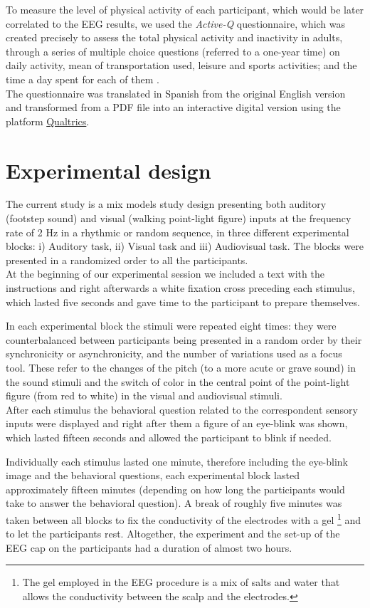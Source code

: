 To measure the level of physical activity of each participant, which would be later correlated to the EEG results, we used the \textit{Active-Q} questionnaire, which was created precisely to assess the total physical activity and inactivity in adults, through a series of multiple choice questions (referred to a one-year time) on daily activity, mean of transportation used, leisure and sports activities; and the time a day spent for each of them \parencite{Bonn_2012}. \\
The questionnaire was translated in Spanish from the original English version and transformed from a PDF file into an interactive digital version using the platform \href{https://www.qualtrics.com/uk/?rid=ip&prevsite=en&newsite=uk&geo=ES&geomatch=uk}{Qualtrics}. 

\section{Experimental design}
The current study is a mix models study design presenting both auditory (footstep sound) and visual (walking point-light figure) inputs at the frequency rate of 2 Hz in a rhythmic or random sequence, in three different experimental blocks: i) Auditory task, ii) Visual task and iii) Audiovisual task. The blocks were presented in a randomized order to all the participants. \\
At the beginning of our experimental session we included a text with the instructions and right afterwards a white fixation cross preceding each stimulus, which lasted five seconds and gave time to the participant to prepare themselves. 

In each experimental block the stimuli were repeated eight times: they were counterbalanced between participants being presented in a random order by their synchronicity or asynchronicity, and the number of variations used as a focus tool. These refer to the changes of the pitch (to a more acute or grave sound) in the sound stimuli and the switch of color  in the central point of the point-light figure (from red to white) in the visual and audiovisual stimuli. \\
After each stimulus the behavioral question related to the correspondent sensory inputs were displayed and right after them a figure of an eye-blink was shown, which lasted fifteen seconds and allowed the participant to blink if needed.

Individually each stimulus lasted one minute, therefore including the eye-blink image and the behavioral questions, each experimental block lasted approximately fifteen minutes (depending on how long the participants would take to answer the behavioral question). A break of roughly five minutes was taken between all blocks to fix the conductivity of the electrodes with a gel \footnote{The gel employed in the EEG procedure is a mix of salts and water that allows the conductivity between the scalp and the electrodes.} and to let the participants rest. Altogether, the experiment and the set-up of the EEG cap on the participants had a duration of almost two hours.

